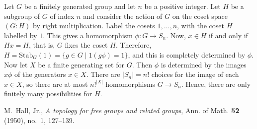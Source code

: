 \documentclass[12pt]{article}
\newcommand{\stab}{\mathrm{Stab}}
\begin{document}
Let $G$ be a finitely generated group and let $n$ be a positive
integer. Let $H$ be a subgroup of $G$ of index $n$ and consider the
action of $G$ on the coset space $(G:H)$ by right multiplication.
Label the cosets $1, \ldots, n$, with the coset $H$ labelled by $1$.
This gives a homomorphism $\phi : G \to S_n$. Now, $x \in H$ if and
only if $Hx = H$, that is, $G$ fixes the coset $H$. Therefore, $H =
\stab_G(1) = \{g \in G \mid 1(g\phi) = 1\}$, and this is completely
determined by $\phi$. Now let $X$ be a finite generating set for $G$.
Then $\phi$ is determined by the images $x\phi$ of the generators $x
\in X$. There are $|S_n| = n!$ choices for the image of each $x \in
X$, so there are at most $n!^{|X|}$ homomorphisms $G \to S_n$. Hence,
there are only finitely many possibilities for $H$.

\begin{thebibliography}{99}

M.~{Hall, Jr.}, \emph{A topology for free groups and related groups}, Ann. of
  Math. \textbf{52} (1950), no.~1, 127--139.

\end{thebibliography}
\end{document}
